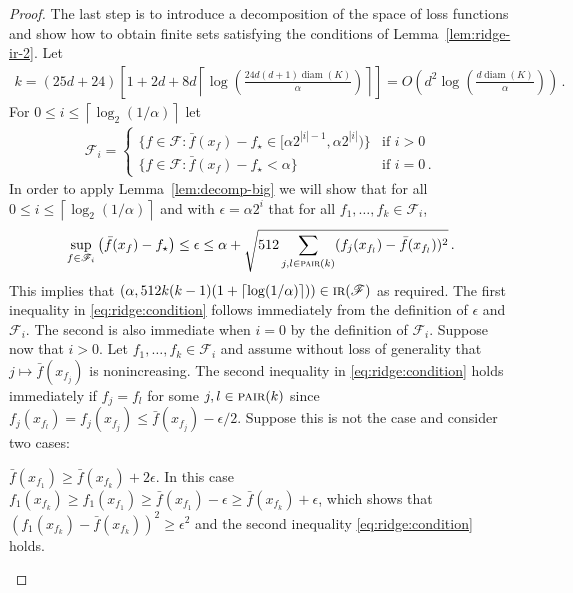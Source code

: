 \documentclass[letter, 12pt]{report}
\newcommand{\ceil}[1]{\left\lceil #1 \right\rceil}
\newcommand{\pair}{\operatorname{\textsc{pair}}}
\newcommand{\sF}{\mathscr F}
\newcommand{\diam}{\operatorname{diam}}
\newcommand{\1}{\mathbf{1}}
\newcommand{\IR}{\operatorname{\textsc{ir}}}
\theoremstyle{plain}
\theoremstyle{definition}
\theoremstyle{remark}
\begin{document}
\begin{proof}
    The last step is to introduce a decomposition of the space of loss functions and show how to obtain finite sets satisfying
    the conditions of Lemma~\ref{lem:ridge-ir-2}.
    Let
    \begin{align*}
        k = (25d + 24)\left[1 + 2d + 8d\ceil{\log\left(\frac{24d(d+1) \diam(K)}{\alpha}\right)}\right] = O\left(d^2 \log\left(\frac{d \diam(K)}{\alpha}\right)\right) \,.
    \end{align*}
    For $0 \leq i \leq \ceil{\log_2(1/\alpha)}$ let
    \begin{align*}
        \sF_i = \begin{cases}
                    \{f \in \sF : \bar f(x_f) - f_\star \in [\alpha 2^{|i|-1}, \alpha 2^{|i|})\} & \text{if } i > 0     \\
                    \{f \in \sF : \bar f(x_f) - f_\star < \alpha\}                               & \text{if } i = 0 \,.
                \end{cases}
    \end{align*}
    In order to apply Lemma~\ref{lem:decomp-big} we will show that for all $0 \leq i \leq \ceil{\log_2(1/\alpha)}$
    and with $\epsilon = \alpha 2^i$ that for all $f_1,\ldots,f_k \in \sF_i$,
    \begin{align}
        \sup_{f \in \sF_i} \left(\bar f(x_f) - f_\star\right) \leq \epsilon \leq \alpha + \sqrt{512 \sum_{j, l \in \pair(k)} (f_j(x_{f_l}) - \bar f(x_{f_l}))^2}\,.
        \label{eq:ridge:condition}
    \end{align}
    This implies that $(\alpha, 512k(k-1) (1 + \ceil{\log(1/\alpha)})) \in \IR(\sF)$ as required.
    The first inequality in \cref{eq:ridge:condition} follows immediately from the definition of $\epsilon$ and $\sF_i$. The second is also immediate when $i = 0$ by the definition of $\sF_i$.
    Suppose now that $i > 0$.
    Let $f_1,\ldots,f_k \in \sF_i$ and
    assume without loss of generality that $j \mapsto \bar f(x_{f_j})$ is nonincreasing.
    The second inequality in \cref{eq:ridge:condition} holds immediately if $f_j = f_l$ for some $j,l \in \pair(k)$ since $f_j(x_{f_l}) = f_j(x_{f_j}) \leq \bar f(x_{f_j}) - \epsilon/2$.
    Suppose this is not the case and consider two cases:
    \begin{enumcases}
        \item $\bar f(x_{f_1}) \geq \bar f(x_{f_k}) + 2\epsilon$. In this case
        $f_1(x_{f_k}) \geq f_1(x_{f_1}) \geq \bar f(x_{f_1}) - \epsilon \geq \bar f(x_{f_k}) + \epsilon$,
        which shows that $(f_1(x_{f_k}) - \bar f(x_{f_k}))^2 \geq \epsilon^2$ and the second inequality \cref{eq:ridge:condition} holds.

\end{enumcases}
\end{proof}
\end{document}
